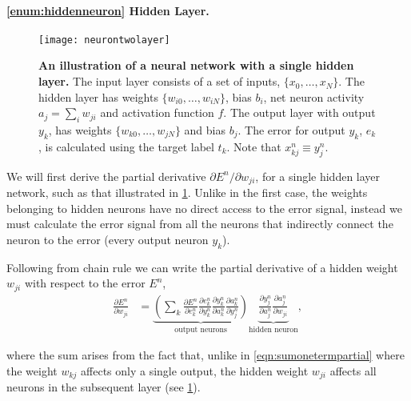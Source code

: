 \documentclass[thesis]{subfiles}
\begin{document}
\paragraph{\ref{enum:hiddenneuron} Hidden Layer.}
\begin{figure}[tbp]
\centering
\texttt{[image: neurontwolayer]}
\caption[An illustration of a neural network with a single hidden layer]{\textbf{An illustration of a neural network with a single hidden layer.} The input layer consists of a set of inputs, $\{x_{0}, \ldots, x_{N}\}$. The hidden layer has weights $\{w_{i0}, \ldots, w_{iN}\}$, bias $b_i$, net neuron activity $a_j = \sum_i w_{ji}$ and activation function $f$. The output layer with output $y_k$, has weights $\{w_{k0}, \ldots, w_{jN}\}$ and bias $b_j$. The error for output $y_k$, $e_k$, is calculated using the target label $t_k$. Note that $x^n_{kj} \equiv y^n	_j$.}
\label{fig:neurontwolayer}
\end{figure}
We will first derive the partial derivative ${\partial E^n}/{\partial w_{ji}}$, for a single hidden layer network, such as that illustrated in \cref{fig:neurontwolayer}. Unlike in the first case, the weights belonging to hidden neurons have no direct access to the error signal, instead we must calculate the error signal from all the neurons that indirectly connect the neuron to the error (\ie{}every output neuron $y_k$).

Following from chain rule we can write the partial derivative of a hidden weight $w_{ji}$ with respect to the error $E^n$,
\begin{equation}
\begin{aligned}
    \frac{\partial E^n}{\partial w_{ji}} &= \underbrace{\left( \sum_k \frac{\partial E^n}{\partial e^n_{k}}
     \frac{\partial e^n_{k}}{\partial y^n_{k}} \frac{\partial y^n_{k}}{\partial a^n_k} \frac{\partial a^n_k}{\partial y^n_{j}}\right)}_\text{output neurons}
     \underbrace{\frac{\partial y^n_{j}}{\partial a^n_{j}} \frac{\partial a^n_{j}}{\partial w_{ji}}}_\text{hidden neuron},
     \label{eqn:twolayer1}
\end{aligned}
\end{equation}

where the sum arises from the fact that, unlike in \cref{eqn:sumonetermpartial} where the weight $w_{kj}$ affects only a single output, the hidden weight $w_{ji}$ affects all neurons in the subsequent layer (see \cref{fig:neurontwolayer}).
\end{document}
